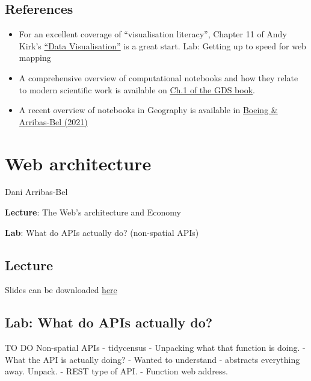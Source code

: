 \documentclass[
  letterpaper,
  DIV=11,
  numbers=noendperiod]{scrreprt}
\providecommand{\tightlist}{%
  \setlength{\itemsep}{0pt}\setlength{\parskip}{0pt}}\usepackage{longtable,booktabs,array}
\begin{document}
\hypertarget{references}{%
\section{References}\label{references}}

\begin{itemize}
\tightlist
\item
  For an excellent coverage of ``visualisation literacy'', Chapter 11 of
  Andy Kirk's \href{https://www.visualisingdata.com/book/}{``Data
  Visualisation''} is a great start. Lab: Getting up to speed for web
  mapping
\item
  A comprehensive overview of computational notebooks and how they
  relate to modern scientific work is available on
  \href{https://geographicdata.science/book/notebooks/01_geo_thinking.html}{Ch.1
  of the GDS book}.
\item
  A recent overview of notebooks in Geography is available in
  \href{https://gistbok.ucgis.org/bok-topics/gis-and-computational-notebooks}{Boeing
  \& Arribas-Bel (2021)}
\end{itemize}


\hypertarget{web-architecture}{%
\chapter{Web architecture}\label{web-architecture}}

Dani Arribas-Bel

\textbf{Lecture}: The Web's architecture and Economy

\textbf{Lab}: What do APIs actually do? (non-spatial APIs)

\hypertarget{lecture-1}{%
\section{Lecture}\label{lecture-1}}

Slides can be downloaded
\href{https://github.com/GDSL-UL/wma/raw/main/pdf/lecture_02.pdf}{here}

\hypertarget{lab-what-do-apis-actually-do}{%
\section{Lab: What do APIs actually
do?}\label{lab-what-do-apis-actually-do}}

TO DO Non-spatial APIs - tidycensus - Unpacking what that function is
doing. - What the API is actually doing? - Wanted to understand -
abstracts everything away. Unpack. - REST type of API. - Function web
address.
\end{document}
